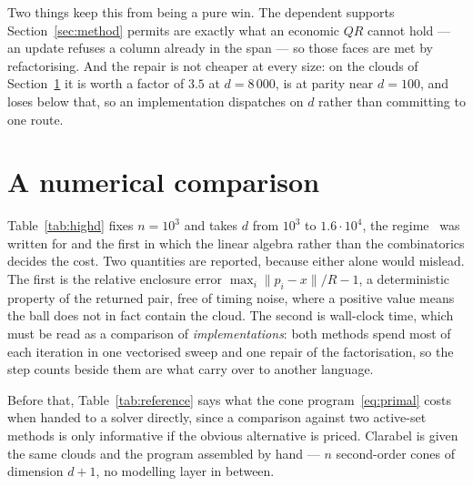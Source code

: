 \documentclass[10pt,a4paper]{article}
\theoremstyle{plain}
\newcommand{\norm}[1]{\lVert #1 \rVert}
\begin{document}
Two things keep this from being a pure win. The dependent supports
Section~\ref{sec:method} permits are exactly what an economic $QR$ cannot hold ---
an update refuses a column already in the span --- so those faces are met by
refactorising. And the repair is not cheaper at every size: on the clouds of
Section~\ref{sec:numerics} it is worth a factor of $3.5$ at $d=8\,000$, is at
parity near $d=100$, and loses below that, so an implementation dispatches on $d$
rather than committing to one route.

\section{A numerical comparison}
\label{sec:numerics}

Table~\ref{tab:highd} fixes $n=10^3$ and takes $d$ from $10^3$ to
$1.6\cdot10^4$, the regime~\cite{fischer2003} was written for and the first in
which the linear algebra rather than the combinatorics decides the cost. Two
quantities are reported, because either alone would mislead. The first is the
relative enclosure error $\max_i\norm{p_i-x}/R-1$, a deterministic property of the
returned pair, free of timing noise, where a positive value means the ball does
not in fact contain the cloud. The second is wall-clock time, which must be read
as a comparison of \emph{implementations}: both methods spend most of each
iteration in one vectorised sweep and one repair of the factorisation, so the step
counts beside them are what carry over to another language.

Before that, Table~\ref{tab:reference} says what the cone program~\eqref{eq:primal}
costs when handed to a solver directly, since a comparison against two active-set
methods is only informative if the obvious alternative is priced. Clarabel is given
the same clouds and the program assembled by hand --- $n$ second-order cones of
dimension $d+1$, no modelling layer in between.
\end{document}
